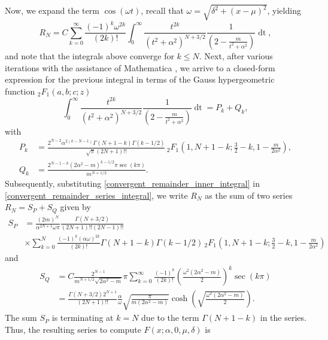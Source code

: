\documentclass[10pt,a4paper,oneside]{article}
\numberwithin{equation}{section}
\begin{document}
Now, we expand the term $\cos(\omega t)$, recall that $\omega = \sqrt{\delta^2 + (x-\mu)^2}$, yielding
\begin{equation}\label{convergent_remainder_series_integral}
R_N = C \sum_{k=0}^{\infty} \frac{(-1)^k \omega^{2k}}{(2k)!} \int_0^{\infty} \frac{t^{2k}}{(t^2 + \alpha^2)^{N + 3/2}} \frac{1}{\left(2 - \frac{m}{t^2+ \alpha^2}\right)} \mathop{dt},
\end{equation}
and note that the integrals above converge for $k \le N$. Next, after various iterations with the assistance of Mathematica \cite{Mathematica}, we arrive to a closed-form expression for the previous integral in terms of the Gauss hypergeometric function $_2F_1(a, b; c; z)$ \cite[\S 15]{NIST:DLMF}
\begin{equation}\label{convergent_remainder_inner_integral}
\int_0^{\infty} \frac{t^{2k}}{(t^2 + \alpha^2)^{N + 3/2}} \frac{1}{\left(2 - \frac{m}{t^2+ \alpha^2}\right)} \mathop{dt} = P_k + Q_k,
\end{equation}
with
\begin{align}
P_k &= \frac{2^{N-2}\alpha^{2(k - N - 1)} \Gamma(N + 1 - k) \Gamma(k - 1/2)}{\sqrt{\pi} (2N + 1)!!} \, _2F_1\left(1, N + 1 - k; \frac{3}{2} -k, 1 - \frac{m}{2\alpha^2}\right),\\
Q_k &= \frac{2^{N-1-k}(2\alpha^2 - m)^{k - 1/2} \pi \sec(k\pi)}{m^{N + 1/2}}.
\end{align}
Subsequently, substituting \eqref{convergent_remainder_inner_integral} in \eqref{convergent_remainder_series_integral}, we write $R_N$ as the sum of two series $R_N  = S_P + S_Q$ given by
\begin{align}\label{convergent_remainder_series_P}
S_P &= \frac{(2m)^N }{\alpha^{2N + 1} \omega\pi} \frac{\Gamma(N + 3/2)}{(2N + 1)!! (2N - 1)!!} \nonumber\\
&\times \sum_{k=0}^{N} \frac{(-1)^k (\alpha\omega)^{2k}}{(2k)!} \Gamma(N + 1 - k) \Gamma(k - 1/2) \, _2F_1\left(1, N + 1 - k; \frac{3}{2} -k, 1 - \frac{m}{2\alpha^2}\right)
\end{align}
and 
\begin{align}
S_Q &= C \frac{2^{N-1}}{m^{N + 1/2}\sqrt{2\alpha^2 - m}} \pi \sum_{k=0}^{\infty} \frac{(-1)^k}{(2k)!} \left(\frac{\omega^2(2\alpha^2 - m)}{2}\right)^k \sec(k\pi)\nonumber\\
&= \frac{\Gamma(N + 3/2) 2^{N+1}}{(2N + 1)!!} \frac{\alpha}{\omega}\sqrt{\frac{\pi}{m(2\alpha^2 - m)}}\cosh\left(\sqrt{\frac{\omega^2 (2\alpha^2 - m)}{2}}\right).
\end{align}
The sum $S_P$ is terminating at $k=N$ due to the term $\Gamma(N + 1 - k)$ in the series. Thus, the resulting series to compute $F(x; \alpha, 0, \mu, \delta)$ is
\end{document}
